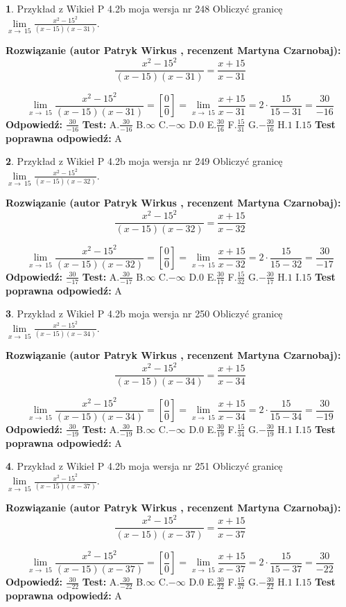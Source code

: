 \documentclass[12pt, a4paper]{article}
\theoremstyle{definition} %
\newtheorem{zad}{}
\newcommand{\zadStart}[1]{\begin{zad}#1\newline}
\newcommand{\zadStop}{\end{zad}}
\newcommand{\rozwStart}[2]{\noindent \textbf{Rozwiązanie (autor #1 , recenzent #2): }\newline}
\newcommand{\rozwStop}{\newline}
\newcommand{\odpStart}{\noindent \textbf{Odpowiedź:}\newline}
\newcommand{\odpStop}{\newline}
\newcommand{\testStart}{\noindent \textbf{Test:}\newline}
\newcommand{\testStop}{\newline}
\newcommand{\kluczStart}{\noindent \textbf{Test poprawna odpowiedź:}\newline}
\newcommand{\kluczStop}{\newline}
\begin{document}
\zadStart{Przykład z Wikieł P 4.2b moja wersja nr 248}
Obliczyć granicę $\lim\limits_{x\to\ 15}\frac{x^{2}-15^{2}}{(x-15)(x-31)}$.
\zadStop
\rozwStart{Patryk Wirkus}{Martyna Czarnobaj}
$$\frac{x^{2}-15^{2}}{(x-15)(x-31)}=\frac{x+15}{x-31}$$

$$\lim\limits_{x\to\ 15}\frac{x^{2}-15^{2}}{(x-15)(x-31)}=[\frac{0}{0}]=\lim\limits_{x\to\ 15}\frac{x+15}{x-31}=2 \cdot \frac{15}{15-31} = \frac{30}{-16}$$
\rozwStop
\odpStart
$\frac{30}{-16}$
\odpStop
\testStart
A.$\frac{30}{-16}$
B.$\infty$
C.$-\infty$
D.$0$
E.$\frac{30}{16}$
F.$\frac{15}{31}$
G.$-\frac{30}{16}$
H.$1$
I.$15$
\testStop
\kluczStart
A
\kluczStop



\zadStart{Przykład z Wikieł P 4.2b moja wersja nr 249}
Obliczyć granicę $\lim\limits_{x\to\ 15}\frac{x^{2}-15^{2}}{(x-15)(x-32)}$.
\zadStop
\rozwStart{Patryk Wirkus}{Martyna Czarnobaj}
$$\frac{x^{2}-15^{2}}{(x-15)(x-32)}=\frac{x+15}{x-32}$$

$$\lim\limits_{x\to\ 15}\frac{x^{2}-15^{2}}{(x-15)(x-32)}=[\frac{0}{0}]=\lim\limits_{x\to\ 15}\frac{x+15}{x-32}=2 \cdot \frac{15}{15-32} = \frac{30}{-17}$$
\rozwStop
\odpStart
$\frac{30}{-17}$
\odpStop
\testStart
A.$\frac{30}{-17}$
B.$\infty$
C.$-\infty$
D.$0$
E.$\frac{30}{17}$
F.$\frac{15}{32}$
G.$-\frac{30}{17}$
H.$1$
I.$15$
\testStop
\kluczStart
A
\kluczStop



\zadStart{Przykład z Wikieł P 4.2b moja wersja nr 250}
Obliczyć granicę $\lim\limits_{x\to\ 15}\frac{x^{2}-15^{2}}{(x-15)(x-34)}$.
\zadStop
\rozwStart{Patryk Wirkus}{Martyna Czarnobaj}
$$\frac{x^{2}-15^{2}}{(x-15)(x-34)}=\frac{x+15}{x-34}$$

$$\lim\limits_{x\to\ 15}\frac{x^{2}-15^{2}}{(x-15)(x-34)}=[\frac{0}{0}]=\lim\limits_{x\to\ 15}\frac{x+15}{x-34}=2 \cdot \frac{15}{15-34} = \frac{30}{-19}$$
\rozwStop
\odpStart
$\frac{30}{-19}$
\odpStop
\testStart
A.$\frac{30}{-19}$
B.$\infty$
C.$-\infty$
D.$0$
E.$\frac{30}{19}$
F.$\frac{15}{34}$
G.$-\frac{30}{19}$
H.$1$
I.$15$
\testStop
\kluczStart
A
\kluczStop



\zadStart{Przykład z Wikieł P 4.2b moja wersja nr 251}
Obliczyć granicę $\lim\limits_{x\to\ 15}\frac{x^{2}-15^{2}}{(x-15)(x-37)}$.
\zadStop
\rozwStart{Patryk Wirkus}{Martyna Czarnobaj}
$$\frac{x^{2}-15^{2}}{(x-15)(x-37)}=\frac{x+15}{x-37}$$

$$\lim\limits_{x\to\ 15}\frac{x^{2}-15^{2}}{(x-15)(x-37)}=[\frac{0}{0}]=\lim\limits_{x\to\ 15}\frac{x+15}{x-37}=2 \cdot \frac{15}{15-37} = \frac{30}{-22}$$
\rozwStop
\odpStart
$\frac{30}{-22}$
\odpStop
\testStart
A.$\frac{30}{-22}$
B.$\infty$
C.$-\infty$
D.$0$
E.$\frac{30}{22}$
F.$\frac{15}{37}$
G.$-\frac{30}{22}$
H.$1$
I.$15$
\testStop
\kluczStart
A
\kluczStop
\end{document}
